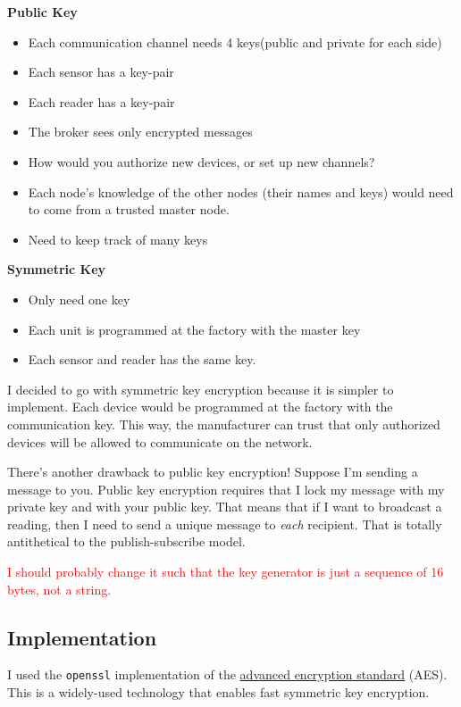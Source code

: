 \documentclass[final,titlepage,onecolumn]{article}
\begin{document}
\textbf{Public Key}
\begin{itemize}
	\item Each communication channel needs 4 keys(public and private for each side)
	\item Each sensor has a key-pair
	\item Each reader has a key-pair
	\item The broker sees only encrypted messages
	\item How would you authorize new devices, or set up new channels?
	\item Each node's knowledge of the other nodes (their names and keys) would need to come from a trusted master node.
	\item Need to keep track of many keys
\end{itemize}

\textbf{Symmetric Key}
\begin{itemize}
	\item Only need one key
	\item Each unit is programmed at the factory with the master key
	\item Each sensor and reader has the same key.
\end{itemize}

I decided to go with symmetric key encryption because it is simpler to implement. Each device would be programmed at the factory with the communication key. This way, the manufacturer can trust that only authorized devices will be allowed to communicate on the network.

There's another drawback to public key encryption! Suppose I'm sending a message to you. Public key encryption requires that I lock my message with my private key and with your public key. That means that if I want to broadcast a reading, then I need to send a unique message to \emph{each} recipient. That is totally antithetical to the publish-subscribe model.

\textcolor{red}{I should probably change it such that the key generator is just a sequence of 16 bytes, not a string.}


\subsection{Implementation}
I used the \texttt{openssl} implementation of the \href{https://www.youtube.com/watch?v=O4xNJsjtN6E}{advanced encryption standard} (AES). This is a widely-used technology that enables fast symmetric key encryption.
\end{document}
